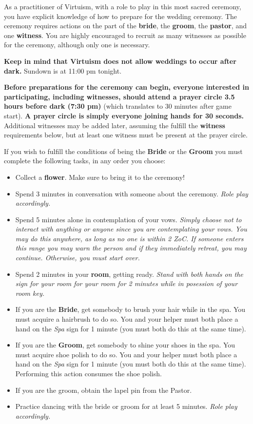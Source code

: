 \documentclass[green]{guildcamp1}
\begin{document}
\name{\gPrepareWedding{}}

As a practitioner of Virtuism, with a role to play in this most sacred ceremony, you have explicit knowledge of how to prepare for the wedding ceremony. The ceremony requires actions on the part of the {\bf bride}, the {\bf groom}, the {\bf pastor}, and one {\bf witness}. You are highly encouraged to recruit as many witnesses as possible for the ceremony, although only one is necessary.

{\bf Keep in mind that Virtuism does not allow weddings to occur after dark.} Sundown is at 11:00 pm tonight.

{\bf Before preparations for the ceremony can begin, everyone interested in participating, including witnesses, should attend a prayer circle 3.5 hours before dark (7:30 pm)} (which translates to 30 minutes after game start). {\bf A prayer circle is simply everyone joining hands for 30 seconds.} Additional witnesses may be added later, assuming the fulfill the {\bf witness} requirements below, but at least one witness must be present at the prayer circle.

If you wish to fulfill the conditions of being the {\bf Bride} or the {\bf Groom} you must complete the following tasks, in any order you choose:
\begin{itemize}
  \item Collect a {\bf flower}. Make sure to bring it to the ceremony!
  \item Spend 3 minutes in conversation with someone about the ceremony. {\it Role play accordingly.}
  \item Spend 5 minutes alone in contemplation of your vows. {\it Simply choose not to interact with anything or anyone since you are contemplating your vows. You may do this anywhere, as long as no one is within 2 ZoC. If someone enters this range you may warn the person and if they immediately retreat, you may continue. Otherwise, you must start over.}
  \item Spend 2 minutes in your {\bf room}, getting ready. {\it Stand with both hands on the sign for your room for your room for 2 minutes while in posession of your room key.}
  \item If you are the {\bf Bride}, get somebody to brush your hair while in the spa. You must acquire a hairbrush to do so. You and your helper must both place a hand on the {\em Spa} sign for 1 minute (you must both do this at the same time).
  \item If you are the {\bf Groom}, get somebody to shine your shoes in the spa. You must acquire shoe polish to do so. You and your helper must both place a hand on the {\em Spa} sign for 1 minute (you must both do this at the same time). Performing this action consumes the shoe polish.
  \item If you are the groom, obtain the lapel pin from the Pastor.
  \item Practice dancing with the bride or groom for at least 5 minutes. {\it Role play accordingly.}
\end{itemize}
\end{document}
